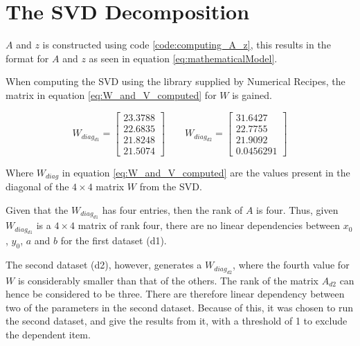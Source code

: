 \section{The SVD Decomposition}

$A$ and $z$ is constructed using code \ref{code:computing_A_z}, this results in the format for $A$ and $z$ as seen in equation \ref{eq:mathematicalModel}.



When computing the SVD using the library supplied by Numerical Recipes, the matrix in equation \ref{eq:W_and_V_computed} for $W$
is gained.

\begin{equation}
W_{diag_{d1}} = 
\left[
\begin{array}{c}
23.3788 \\
22.6835 \\
21.8248 \\
21.5074
\end{array}
\right]
% 
\qquad
% 
W_{diag_{d2}} = 
\left[
\begin{array}{c}
31.6427\\
22.7755\\
21.9092\\
0.0456291
\end{array}
\right]
\label{eq:W_and_V_computed}
\end{equation}

Where $W_{diag}$ in equation \ref{eq:W_and_V_computed} are the values present in the diagonal of the $4 \times 4$ matrix $W$ from the SVD.

Given that the $W_{diag_{d1}}$ has four entries, then the rank of $A$ is four. 
Thus, given $W_{diag_{d1}}$ is a $4 \times 4$ matrix of rank four, there are no linear dependencies between $x_0$, $y_0$, $a$ and $b$ for the first dataset (d1).

The second dataset (d2), however, generates a $W_{diag_{d2}}$, where the fourth value for $W$ is considerably smaller than that of the others.
The rank of the matrix $A_{d2}$ can hence be considered to be three.
There are therefore linear dependency between two of the parameters in the second dataset.
Because of this, it was chosen to run the second dataset, and give the results from it, with a threshold of 1 to exclude the dependent item.



